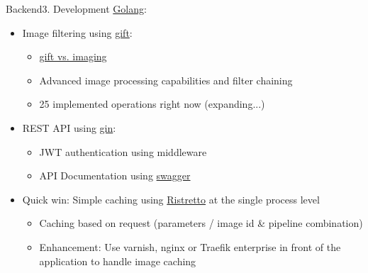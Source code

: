 \documentclass[aspectratio=169,20pt]{beamer}
\begin{document}
\begin{frame}{Backend}{3. Development}
	\underline{Golang}:
	\begin{itemize}
		\item{Image filtering using \href{https://github.com/disintegration/gift}{gift}:}
		\begin{itemize}
			\item{\href{https://github.com/disintegration/imaging\#whats-the-difference-between-imaging-and-gift-packages}{gift vs. imaging}}
			\item{Advanced image processing capabilities and filter chaining}
			\item{25 implemented operations right now (expanding...)}
		\end{itemize}
		\item{REST API using \href{https://github.com/gin-gonic/gin}{gin}:}
		\begin{itemize}
			\item{JWT authentication using middleware}
			\item{API Documentation using \href{https://github.com/swaggo/swag}{swagger}}
		\end{itemize}
		\item{Quick win: Simple caching using \href{https://github.com/dgraph-io/ristretto}{Ristretto} at the single process level}
		\begin{itemize}
			\item{Caching based on request (parameters / image id \& pipeline combination)}
			\item{Enhancement: Use varnish, nginx or Traefik enterprise in front of the application to handle image caching}
		\end{itemize}
	\end{itemize}
\end{frame}
\end{document}
